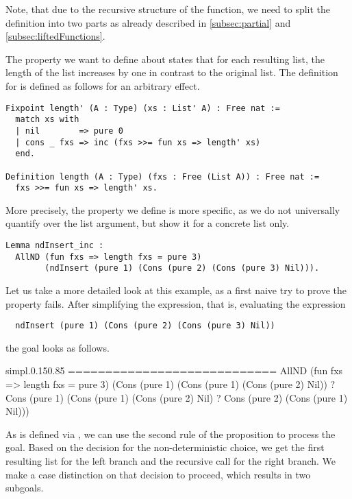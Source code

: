 Note, that due to the recursive structure of the function, we need to split the definition into two parts as already described in \autoref{subsec:partial} and \autoref{subsec:liftedFunctions}.

The property we want to define about  states that for each resulting list, the length of the list increases by one in contrast to the original list.
The definition for  is defined as follows for an arbitrary effect.

\begin{verbatim}
Fixpoint length' (A : Type) (xs : List' A) : Free nat :=
  match xs with
  | nil        => pure 0
  | cons _ fxs => inc (fxs >>= fun xs => length' xs)
  end.

Definition length (A : Type) (fxs : Free (List A)) : Free nat :=
  fxs >>= fun xs => length' xs.
\end{verbatim}
  
More precisely, the property we define is more specific, as we do not universally quantify over the list argument, but show it for a concrete list only.

\begin{verbatim}
Lemma ndInsert_inc :
  AllND (fun fxs => length fxs = pure 3)
        (ndInsert (pure 1) (Cons (pure 2) (Cons (pure 3) Nil))).
\end{verbatim}

Let us take a more detailed look at this example, as a first naive try to prove the property fails.
After simplifying the expression, that is, evaluating the expression
\begin{verbatim}
  ndInsert (pure 1) (Cons (pure 2) (Cons (pure 3) Nil))
\end{verbatim}
the goal looks as follows.

\begin{cproof1}{simpl.}{0.15}{0.85}
  ============================
  AllND (fun fxs => length fxs = pure 3)
        (Cons (pure 1) (Cons (pure 1) (Cons (pure 2) Nil))
        ? Cons (pure 1) (Cons (pure 1) (Cons (pure 2) Nil)
        ? Cons (pure 2) (Cons (pure 1) Nil)))
\end{cproof1}

As  is defined via , we can use the second rule of the proposition to process the goal.
Based on the decision for the non\--deterministic choice, we get the first resulting list for the left branch and the recursive call for the right branch.
We make a case distinction on that decision to proceed, which results in two subgoals.

